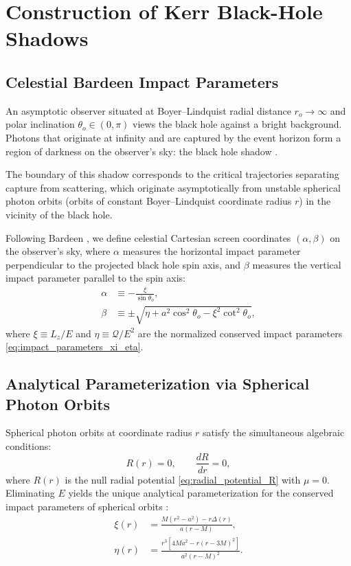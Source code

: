 \section{Construction of Kerr Black-Hole Shadows}
\label{sec:shadow_construction}

\subsection{Celestial Bardeen Impact Parameters}
An asymptotic observer situated at Boyer--Lindquist radial distance $r_o \to \infty$ and polar inclination $\theta_o \in (0, \pi)$ views the black hole against a bright background. Photons that originate at infinity and are captured by the event horizon form a region of darkness on the observer's sky: the black hole shadow \cite{Bardeen1973,CunninghamBardeen1972,CunninghamBardeen1973,Falcke2000}.

The boundary of this shadow corresponds to the critical trajectories separating capture from scattering, which originate asymptotically from unstable spherical photon orbits (orbits of constant Boyer--Lindquist coordinate radius $r$) in the vicinity of the black hole.

Following Bardeen \cite{Bardeen1973}, we define celestial Cartesian screen coordinates $(\alpha, \beta)$ on the observer's sky, where $\alpha$ measures the horizontal impact parameter perpendicular to the projected black hole spin axis, and $\beta$ measures the vertical impact parameter parallel to the spin axis:
\begin{align}
    \alpha &\equiv -\frac{\xi}{\sin\theta_o}, \label{eq:bardeen_alpha} \\
    \beta &\equiv \pm \sqrt{\eta + a^2\cos^2\theta_o - \xi^2\cot^2\theta_o}, \label{eq:bardeen_beta}
\end{align}
where $\xi \equiv L_z/E$ and $\eta \equiv \mathcal{Q}/E^2$ are the normalized conserved impact parameters \eqref{eq:impact_parameters_xi_eta}.

\subsection{Analytical Parameterization via Spherical Photon Orbits}
Spherical photon orbits at coordinate radius $r$ satisfy the simultaneous algebraic conditions:
\begin{equation}
    R(r) = 0, \qquad \frac{dR}{dr} = 0,
    \label{eq:spherical_orbit_conditions}
\end{equation}
where $R(r)$ is the null radial potential \eqref{eq:radial_potential_R} with $\mu = 0$. Eliminating $E$ yields the unique analytical parameterization for the conserved impact parameters of spherical orbits \cite{Bardeen1973,Chandrasekhar1983,Teo2003,Teo2021}:
\begin{align}
    \xi(r) &= \frac{M(r^2 - a^2) - r\Delta(r)}{a(r - M)}, \label{eq:spherical_xi} \\
    \eta(r) &= \frac{r^3 \left[ 4Ma^2 - r(r - 3M)^2 \right]}{a^2(r - M)^2}. \label{eq:spherical_eta}
\end{align}

